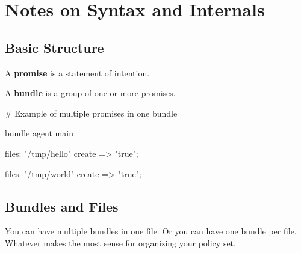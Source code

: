 



\chapter{Notes on Syntax and Internals}





\section{Basic Structure}

A \textbf{promise} is a statement of intention.

A \textbf{bundle} is a group of one or more promises.

\begin{codelisting}
\begin{code}
# Example of multiple promises in one bundle

bundle agent main
{
  files:
      "/tmp/hello"
        create  => "true";

  files:
      "/tmp/world"
        create  => "true";
}
\end{code}
\end{codelisting}





\section{Bundles and Files}

You can have multiple bundles in one file. Or you can have one bundle
per file. Whatever makes the most sense for organizing your policy set.

\begin{codelisting}
\end{codelisting}





